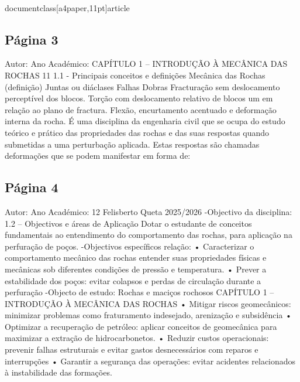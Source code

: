 \\documentclass[a4paper,11pt]{article}
\begin{document}
\subsection*{Página 3}
Autor:
Ano Académico:
CAPÍTULO 1 – INTRODUÇÃO À MECÂNICA DAS ROCHAS
11
1.1 - Principais conceitos e definições 
Mecânica das Rochas (definição)
Juntas ou diáclases
Falhas
Dobras
Fracturação sem 
deslocamento perceptível dos 
blocos.
Torção com deslocamento 
relativo de blocos um em 
relação ao plano de fractura.
Flexão,  encurtamento
acentuado e deformação
interna da rocha.
É uma disciplina da engenharia civil que se ocupa do estudo teórico e prático das propriedades das
rochas e das suas respostas quando submetidas a uma perturbação aplicada. Estas respostas são
chamadas deformações que se podem manifestar em forma de:



\subsection*{Página 4}
Autor:
Ano Académico:
12
Felisberto Queta
2025/2026
-Objectivo da disciplina:
1.2 – Objectivos e áreas de Aplicação
Dotar o estudante de conceitos fundamentais ao entendimento do comportamento das rochas, para aplicação na perfuração
de poços.
-Objectivos específicos relação:
•
Caracterizar
o
comportamento
mecânico das rochas
entender suas propriedades físicas e mecânicas sob diferentes condições de
pressão e temperatura.
• Prever a estabilidade dos poços:
evitar colapsos e perdas de circulação durante a perfuração
-Objecto de estudo:
Rochas e maciços rochosos
CAPÍTULO 1 – INTRODUÇÃO À MECÂNICA DAS ROCHAS
• Mitigar riscos geomecânicos:
minimizar problemas como fraturamento indesejado, arenização e subsidência
• Optimizar a recuperação de petróleo:
aplicar
conceitos
de
geomecânica
para
maximizar
a
extração
de
hidrocarbonetos.
• Reduzir custos operacionais:
prevenir falhas estruturais e evitar gastos desnecessários com reparos e
interrupções
• Garantir a segurança das operações:
evitar acidentes relacionados à instabilidade das formações.
\end{document}
